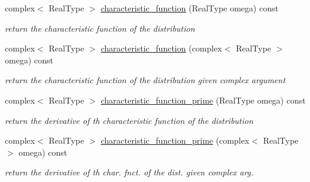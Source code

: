 \begin{DoxyCompactItemize}
\mbox{\label{classpareto__distribution_acef7b13822b8ea6489c01d43bb71caf9}} 
complex$<$ Real\+Type $>$ \mbox{\hyperlink{classpareto__distribution_acef7b13822b8ea6489c01d43bb71caf9}{characteristic\+\_\+function}} (Real\+Type omega) const
\begin{DoxyCompactList}\small\item\em return the characteristic function of the distribution \end{DoxyCompactList}\item 
\mbox{\label{classpareto__distribution_a16760711aa205086d54b08c601c39fac}} 
complex$<$ Real\+Type $>$ \mbox{\hyperlink{classpareto__distribution_a16760711aa205086d54b08c601c39fac}{characteristic\+\_\+function}} (complex$<$ Real\+Type $>$ omega) const
\begin{DoxyCompactList}\small\item\em return the characteristic function of the distribution given complex argument \end{DoxyCompactList}\item 
\mbox{\label{classpareto__distribution_a3e0c538acff3b7ae2b122cd23d8921fa}} 
complex$<$ Real\+Type $>$ \mbox{\hyperlink{classpareto__distribution_a3e0c538acff3b7ae2b122cd23d8921fa}{characteristic\+\_\+function\+\_\+prime}} (Real\+Type omega) const
\begin{DoxyCompactList}\small\item\em return the derivative of th characteristic function of the distribution \end{DoxyCompactList}\item 
\mbox{\label{classpareto__distribution_ac04f96a919fa7096369301605749c1fa}} 
complex$<$ Real\+Type $>$ \mbox{\hyperlink{classpareto__distribution_ac04f96a919fa7096369301605749c1fa}{characteristic\+\_\+function\+\_\+prime}} (complex$<$ Real\+Type $>$ omega) const
\begin{DoxyCompactList}\small\item\em return the derivative of th char. fnct. of the dist. given complex arg. \end{DoxyCompactList}\item 
\mbox{\label{classpareto__distribution_a0ab5bbfc1834d4184db153a5803922eb}} 

\end{DoxyCompactItemize}
